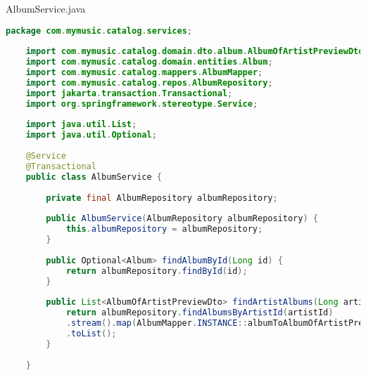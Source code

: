 AlbumService.java
\begin{lstlisting}[language=java]
	package com.mymusic.catalog.services;
	
	import com.mymusic.catalog.domain.dto.album.AlbumOfArtistPreviewDto;
	import com.mymusic.catalog.domain.entities.Album;
	import com.mymusic.catalog.mappers.AlbumMapper;
	import com.mymusic.catalog.repos.AlbumRepository;
	import jakarta.transaction.Transactional;
	import org.springframework.stereotype.Service;
	
	import java.util.List;
	import java.util.Optional;
	
	@Service
	@Transactional
	public class AlbumService {
		
		private final AlbumRepository albumRepository;
		
		public AlbumService(AlbumRepository albumRepository) {
			this.albumRepository = albumRepository;
		}
		
		public Optional<Album> findAlbumById(Long id) {
			return albumRepository.findById(id);
		}
		
		public List<AlbumOfArtistPreviewDto> findArtistAlbums(Long artistId) {
			return albumRepository.findAlbumsByArtistId(artistId)
			.stream().map(AlbumMapper.INSTANCE::albumToAlbumOfArtistPreviewDto)
			.toList();
		}
		
	}
	
\end{lstlisting}

